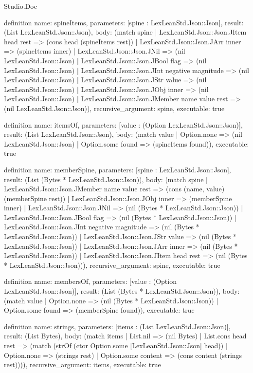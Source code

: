 \begin{lexlean}{Studio.Doc}
\begin{semanticmodule}
definition{
  name: spineItems,
  parameters: [spine : LexLeanStd.Json::Json],
  result: (List LexLeanStd.Json::Json),
  body: (match spine
    | LexLeanStd.Json::Json.JItem head rest => (cons head (spineItems rest))
    | LexLeanStd.Json::Json.JArr inner => (spineItems inner)
    | LexLeanStd.Json::Json.JNil => (nil LexLeanStd.Json::Json)
    | LexLeanStd.Json::Json.JBool flag => (nil LexLeanStd.Json::Json)
    | LexLeanStd.Json::Json.JInt negative magnitude => (nil LexLeanStd.Json::Json)
    | LexLeanStd.Json::Json.JStr value => (nil LexLeanStd.Json::Json)
    | LexLeanStd.Json::Json.JObj inner => (nil LexLeanStd.Json::Json)
    | LexLeanStd.Json::Json.JMember name value rest => (nil LexLeanStd.Json::Json)),
  recursive_argument: spine,
  executable: true
}

definition{
  name: itemsOf,
  parameters: [value : (Option LexLeanStd.Json::Json)],
  result: (List LexLeanStd.Json::Json),
  body: (match value
    | Option.none => (nil LexLeanStd.Json::Json)
    | Option.some found => (spineItems found)),
  executable: true
}

definition{
  name: memberSpine,
  parameters: [spine : LexLeanStd.Json::Json],
  result: (List (Bytes * LexLeanStd.Json::Json)),
  body: (match spine
    | LexLeanStd.Json::Json.JMember name value rest => (cons (name, value) (memberSpine rest))
    | LexLeanStd.Json::Json.JObj inner => (memberSpine inner)
    | LexLeanStd.Json::Json.JNil => (nil (Bytes * LexLeanStd.Json::Json))
    | LexLeanStd.Json::Json.JBool flag => (nil (Bytes * LexLeanStd.Json::Json))
    | LexLeanStd.Json::Json.JInt negative magnitude => (nil (Bytes * LexLeanStd.Json::Json))
    | LexLeanStd.Json::Json.JStr value => (nil (Bytes * LexLeanStd.Json::Json))
    | LexLeanStd.Json::Json.JArr inner => (nil (Bytes * LexLeanStd.Json::Json))
    | LexLeanStd.Json::Json.JItem head rest => (nil (Bytes * LexLeanStd.Json::Json))),
  recursive_argument: spine,
  executable: true
}

definition{
  name: membersOf,
  parameters: [value : (Option LexLeanStd.Json::Json)],
  result: (List (Bytes * LexLeanStd.Json::Json)),
  body: (match value
    | Option.none => (nil (Bytes * LexLeanStd.Json::Json))
    | Option.some found => (memberSpine found)),
  executable: true
}

definition{
  name: strings,
  parameters: [items : (List LexLeanStd.Json::Json)],
  result: (List Bytes),
  body: (match items
    | List.nil => (nil Bytes)
    | List.cons head rest => (match (strOf (ctor Option.some [LexLeanStd.Json::Json] head))
      | Option.none => (strings rest)
      | Option.some content => (cons content (strings rest)))),
  recursive_argument: items,
  executable: true
}


\end{semanticmodule}
\end{lexlean}

